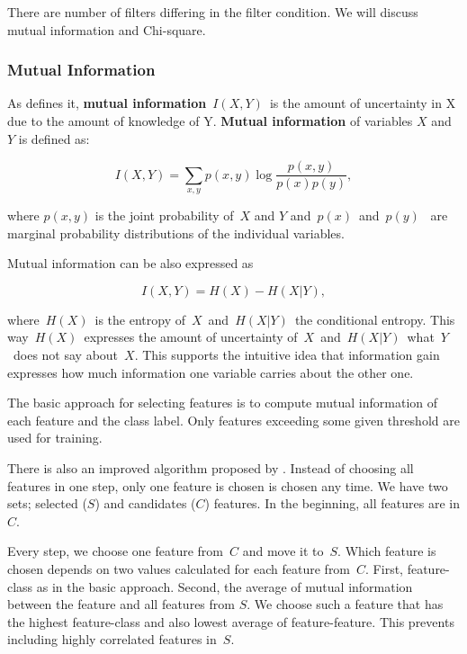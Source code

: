 There are number of filters differing in the filter condition.
We will discuss mutual information and Chi-square.

\subsubsection{Mutual Information}
\label{subsubsec:mi}
As \citet{Hoq14} defines it,
{\bf mutual information}~$I(X, Y)$~is the amount of uncertainty in X due to the amount of knowledge of Y.
{\bf Mutual information} of variables $X$ and $Y$ is defined as:

\begin{equation}
I(X,Y) = \sum_{x,y} p\left(x,y\right)
\log
\frac{p\left(x,y\right)}{p\left(x\right)p\left(y\right)},
\end{equation}

where $p\left(x, y\right)$ is the joint probability of~$X$ and $Y$ and~$p(x)$~and~$p(y)$~
are marginal probability distributions of the individual variables.

Mutual information can be also expressed as

$$I(X, Y) = H(X) - H(X|Y),$$


where~$H(X)$~is the entropy of~$X$~and~$H(X|Y)$~the conditional entropy.
This way~$H(X)$~expresses the amount of uncertainty of~$X$~and~$H(X|Y)$~what~$Y$~does not say about~$X$.
This supports the intuitive idea that information gain expresses how much information one variable carries about the other one.

The basic approach for selecting features is
to compute mutual information of each feature and the class label.
Only features exceeding some given threshold are used for training.

There is also an improved algorithm proposed by \citet{Hoq14}.
Instead of choosing all features in one step,
only one feature is chosen is chosen any time.
We have two sets; selected ($S$) and candidates ($C$) features.
In the beginning, all features are in $C$.

Every step, we choose one feature from~$C$ and move it to~$S$.
Which feature is chosen depends on two values calculated for each feature from~$C$.
First, feature-class as in the basic approach.
Second, the average of mutual information between the feature and all features from $S$.
We choose such a feature that has the highest feature-class and also lowest average of feature-feature.
This prevents including highly correlated features in~$S$.

